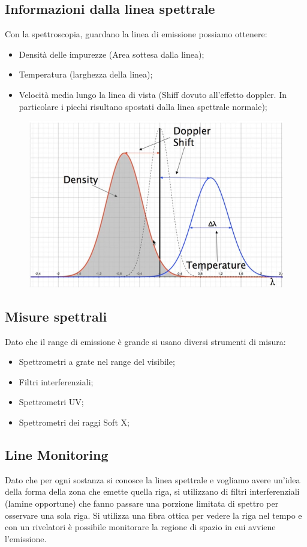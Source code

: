 \documentclass{article}
\begin{document}
\subsection{Informazioni dalla linea spettrale}
Con la spettroscopia, guardano la linea di emissione possiamo ottenere:\begin{itemize}
	\item Densità delle impurezze (Area sottesa dalla linea);
	\item Temperatura (larghezza della linea);
	\item Velocità media lungo la linea di vista (Shiff dovuto all'effetto doppler. In particolare i picchi risultano spostati dalla linea spettrale normale);
\end{itemize}
\begin{center}
	\begin{figure}[b]
		\centering
		\includegraphics[scale=0.4]{2022-06-22-10-52-32.png}%
	\end{figure}
\end{center}
\subsection{Misure spettrali}
Dato che il range di emissione è grande si usano  diversi strumenti di misura:\begin{itemize}
	\item Spettrometri a grate nel range del visibile;
	\item Filtri interferenziali;
	\item Spettrometri UV\@;
	\item Spettrometri dei raggi Soft X\@;
\end{itemize}
\subsection{Line Monitoring}
Dato che per ogni sostanza si conosce la linea spettrale e vogliamo avere un'idea della forma della zona che emette quella riga, si utilizzano di filtri interferenziali (lamine opportune) che fanno passare una porzione limitata di spettro per osservare una sola riga. Si utilizza una fibra ottica per vedere la riga nel tempo e con un rivelatori è possibile monitorare la regione di spazio in cui avviene l'emissione.
\end{document}
